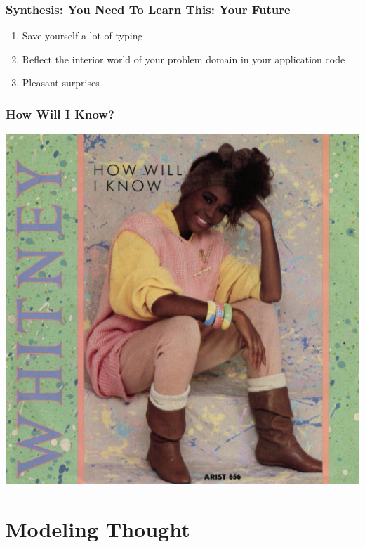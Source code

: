 \documentclass[slidestop,compress,mathserif]{beamer}
\begin{document}
\begin{frame}
	\frametitle{Synthesis:  You Need To Learn This:  Your Future}
	\begin{enumerate}
		\item Save yourself a lot of typing
		\pause
		\item Reflect the interior world of your problem domain in your application code
		\pause
		\item Pleasant surprises
	\end{enumerate}
\end{frame}

\begin{frame}
	\frametitle{How Will I Know?}
	\begin{center}
		\includegraphics[scale=0.10]{img/whitney.jpg}
	\end{center}

\end{frame}

\section{Modeling Thought} %
\label{sec:modeling_thought}
\end{document}
